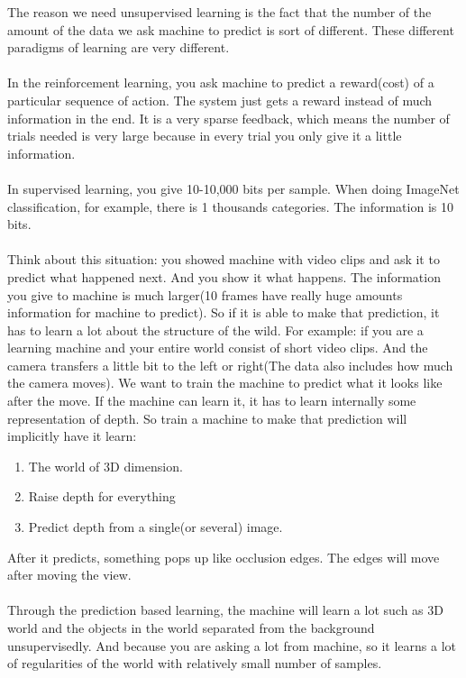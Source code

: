 \documentclass{article}
\begin{document}
The reason we need unsupervised learning is the fact that the number of the amount of the data we ask machine to predict is sort of different. These different paradigms of learning are very different. \\ \\

In the reinforcement learning, you ask machine to predict a reward(cost) of a particular sequence of action. The system just gets a reward instead of much information in the end. 
It is a very sparse feedback, which means the number of trials needed is very large because in every trial you only give it a little information. \\ \\

In supervised learning, you give 10-10,000 bits per sample. When doing ImageNet classification, for example, there is 1 thousands categories. The information is 10 bits. \\ \\

Think about this situation: you showed machine with video clips and ask it to predict what happened next. And you show it what happens. The information you give to machine is much larger(10 frames have really huge amounts information for machine to predict). So if it is able to make that prediction, it has to learn a lot about the structure of the wild. For example: if you are a learning machine and your entire world consist of short video clips. And the camera transfers a little bit to the left or right(The data also includes how much the camera moves). We want to train the machine to predict what it looks like after the move. If the machine can learn it, it has to learn internally some representation of depth. So train a machine to make that prediction will implicitly have it learn: 
\begin{enumerate}
    \item The world of 3D dimension. 
    \item Raise depth for everything
    \item Predict depth from a single(or several) image.
\end{enumerate} 
After it predicts, something pops up like occlusion edges. The edges will move after moving the view.\\ \\

Through the prediction based learning, the machine will learn a lot such as 3D world and the objects in the world separated from the background unsupervisedly. And because you are asking a lot from machine, so it learns a lot of regularities of the world with relatively small number of samples. \\ \\
\end{document}
